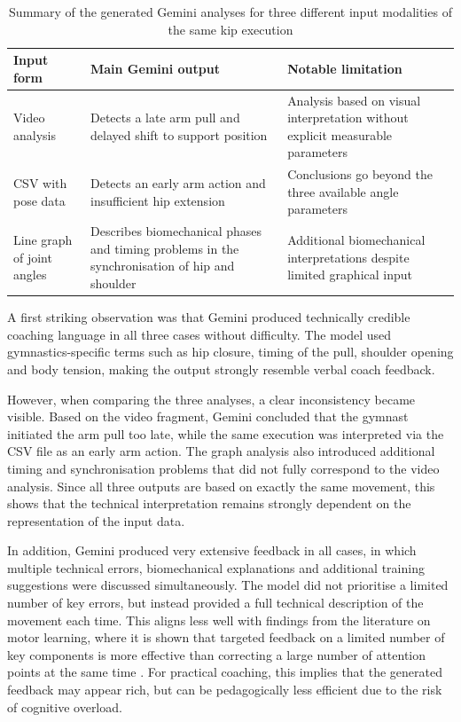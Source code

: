 \begin{table}[H]
    \centering
    \footnotesize
    \begin{tabular}{p{2.5cm}p{4.2cm}p{6cm}}
        \toprule
        \textbf{Input form} & \textbf{Main Gemini output} & \textbf{Notable limitation} \\
        \midrule
        Video analysis & Detects a late arm pull and delayed shift to support position & Analysis based on visual interpretation without explicit measurable parameters \\
        CSV with pose data & Detects an early arm action and insufficient hip extension & Conclusions go beyond the three available angle parameters \\
        Line graph of joint angles & Describes biomechanical phases and timing problems in the synchronisation of hip and shoulder & Additional biomechanical interpretations despite limited graphical input \\
        \bottomrule
    \end{tabular}
    \caption{Summary of the generated Gemini analyses for three different input modalities of the same kip execution}
    \label{tab:gemini_multimodaal}
\end{table}

A first striking observation was that Gemini produced technically credible coaching language in all three cases without difficulty. The model used gymnastics-specific terms such as hip closure, timing of the pull, shoulder opening and body tension, making the output strongly resemble verbal coach feedback.

However, when comparing the three analyses, a clear inconsistency became visible. Based on the video fragment, Gemini concluded that the gymnast initiated the arm pull too late, while the same execution was interpreted via the CSV file as an early arm action. The graph analysis also introduced additional timing and synchronisation problems that did not fully correspond to the video analysis. Since all three outputs are based on exactly the same movement, this shows that the technical interpretation remains strongly dependent on the representation of the input data.

In addition, Gemini produced very extensive feedback in all cases, in which multiple technical errors, biomechanical explanations and additional training suggestions were discussed simultaneously. The model did not prioritise a limited number of key errors, but instead provided a full technical description of the movement each time. This aligns less well with findings from the literature on motor learning, where it is shown that targeted feedback on a limited number of key components is more effective than correcting a large number of attention points at the same time \autocite{Niznikowski2025}. For practical coaching, this implies that the generated feedback may appear rich, but can be pedagogically less efficient due to the risk of cognitive overload.

